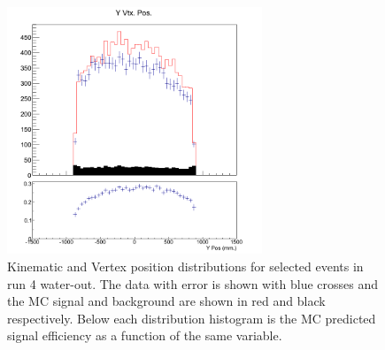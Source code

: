 \begin{figure}[h]
\includegraphics[width=3in]{Figures/TN100Plots/c_Yair_4.png}
\caption{Kinematic and Vertex position distributions for selected events in run 4 water-out. The data with error is shown with blue crosses and the MC signal and background are shown in red and black respectively. Below each distribution histogram is the MC predicted signal efficiency as a function of the same variable.}
\label{fig:xs2run4air}
\end{figure}

